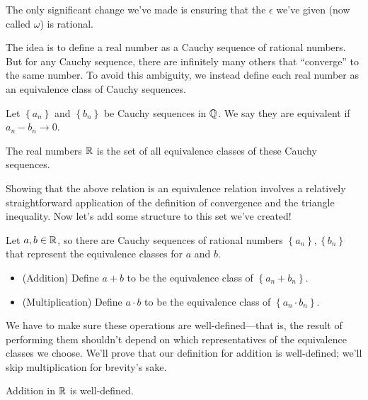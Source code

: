 \documentclass[../m131main.tex]{subfiles}
\begin{document}
The only significant change we've made is ensuring that the $\epsilon$ we've given (now called $\omega$) is rational.

The idea is to define a real number as a Cauchy sequence of rational numbers.
But for any Cauchy sequence, there are infinitely many others that ``converge'' to the same number.
To avoid this ambiguity, we instead define each real number as an equivalence class of Cauchy sequences.

\begin{definition}
    Let $\left\{ a_n \right\}$ and $\left\{ b_n \right\}$ be Cauchy sequences in $\mathbb{Q}$.
    We say they are equivalent if $a_n - b_n \to 0$.

    The real numbers $\mathbb{R}$ is the set of all equivalence classes of these Cauchy sequences.
\end{definition}

Showing that the above relation is an equivalence relation involves a relatively straightforward application of the definition of convergence and the triangle inequality.
Now let's add some structure to this set we've created!

\pagebreak

\begin{definition}
    Let $a,b \in \mathbb{R}$, so there are Cauchy sequences of rational numbers $\left\{ a_n \right\}, \left\{ b_n \right\}$ that represent the equivalence classes for $a$ and $b$.
    \begin{itemize}
        \item (Addition)
        Define $a+b$ to be the equivalence class of $\left\{ a_n + b_n \right\}$.
        \item (Multiplication)
        Define $a \cdot b$ to be the equivalence class of $\left\{ a_n \cdot b_n \right\}$.
    \end{itemize}
\end{definition}

We have to make sure these operations are well-defined---that is, the result of performing them shouldn't depend on which representatives of the equivalence classes we choose.
We'll prove that our definition for addition is well-defined; we'll skip multiplication for brevity's sake.

\begin{theorem}
    Addition in $\mathbb{R}$ is well-defined.
\end{theorem}
\end{document}
